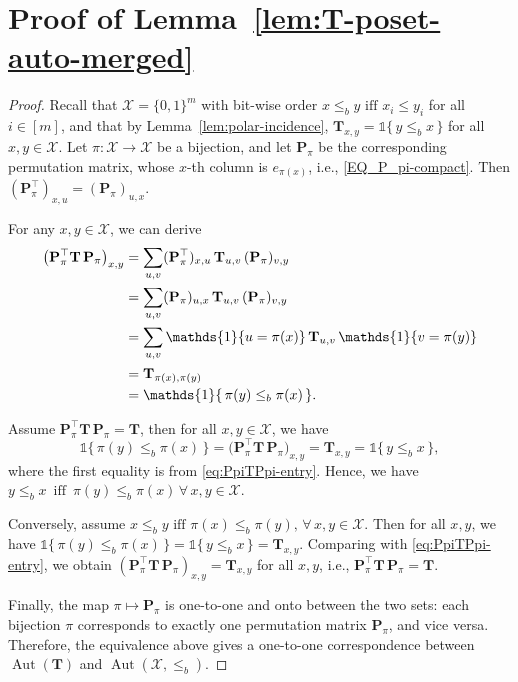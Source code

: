 \documentclass[onecolumn]{IEEEtran} %
\newcommand{\1}{\mathbbm{1}}
\DeclareMathOperator{\Aut}{Aut}
\theoremstyle{boldremark}
\begin{document}
\section{Proof of Lemma~\ref{lem:T-poset-auto-merged}}
\label{APP_proof_lem:T-poset-auto-merged}

\begin{proof}
Recall that \(\mathcal{X}=\{0,1\}^m\) with bit-wise order
\(x\le_b y \mbox{ iff } x_i\le y_i\) for all \(i\in[m]\), and that by
Lemma~\ref{lem:polar-incidence},
\(
  \mathbf{T}_{x,y} = \mathds{1}\{\,y\le_b x\,\}
\)
for all \(x,y\in\mathcal{X}\). Let \(\pi:\mathcal{X}\to\mathcal{X}\) be a bijection, and let
\(\mathbf{P}_\pi\) be the corresponding permutation matrix, whose
\(x\)-th column is \(e_{\pi(x)}\), i.e., \eqref{EQ_P_pi-compact}. 
Then \((\mathbf{P}_\pi^{\top})_{x,u} = (\mathbf{P}_\pi)_{u,x}\).

For any \(x,y\in\mathcal{X}\), we can derive
\begin{align}
  \bigl(\mathbf{P}_\pi^{\top}\mathbf{T}\,\mathbf{P}_\pi\bigr)_{x,y}
  &= \sum_{u,v}
     (\mathbf{P}_\pi^{\top})_{x,u}\,\mathbf{T}_{u,v}\,(\mathbf{P}_\pi)_{v,y}\notag\\
  &= \sum_{u,v}
     (\mathbf{P}_\pi)_{u,x}\,\mathbf{T}_{u,v}\,(\mathbf{P}_\pi)_{v,y}\notag\\
  &= \sum_{u,v}
     \mathds{1}\{u=\pi(x)\}\,\mathbf{T}_{u,v}\,\mathds{1}\{v=\pi(y)\}\label{EQ_Aut_expansion}\\
  &= \mathbf{T}_{\pi(x),\pi(y)}\label{EQ_Aut_expansion2}\\
  &= \mathds{1}\{\,\pi(y)\le_b \pi(x)\,\}.  \label{eq:PpiTPpi-entry}
\end{align}

Assume \(\mathbf{P}_\pi^{\top}\mathbf{T}\,\mathbf{P}_\pi=\mathbf{T}\), then for all \(x,y\in\mathcal{X}\), we have
\[
  \mathds{1}\{\,\pi(y)\le_b \pi(x)\,\}
  = \bigl(\mathbf{P}_\pi^{\top}\mathbf{T}\,\mathbf{P}_\pi\bigr)_{x,y}
  = \mathbf{T}_{x,y}
  = \mathds{1}\{\,y\le_b x\,\},
\]
where the first equality is from \eqref{eq:PpiTPpi-entry}. Hence, we have $ y\le_b x  \,\mbox{ iff }\,  \pi(y)\le_b \pi(x)  \,\forall\,x,y\in\mathcal{X}.$ 

Conversely, assume  $  x\le_b y \mbox{ iff } \pi(x)\le_b \pi(y),  \,\forall\,x,y\in\mathcal{X}.$
Then for all \(x,y\), we have $  \mathds{1}\{\,\pi(y)\le_b \pi(x)\,\}  = \mathds{1}\{\,y\le_b x\,\}  = \mathbf{T}_{x,y}.$
Comparing with \eqref{eq:PpiTPpi-entry}, we obtain
\((\mathbf{P}_\pi^{\top}\mathbf{T}\,\mathbf{P}_\pi)_{x,y} = \mathbf{T}_{x,y}\)
for all \(x,y\), i.e.,
\(
  \mathbf{P}_\pi^{\top}\mathbf{T}\,\mathbf{P}_\pi = \mathbf{T}.
\)


Finally, the map \(\pi\mapsto \mathbf{P}_\pi\) is one-to-one and onto between the two sets:
each bijection \(\pi\) corresponds to exactly one permutation matrix \(\mathbf{P}_\pi\), and vice versa.
Therefore, the equivalence above gives a one-to-one correspondence between \(\Aut(\mathbf{T})\)
and \(\Aut(\mathcal{X},\le_b)\).

\end{proof}
\end{document}
